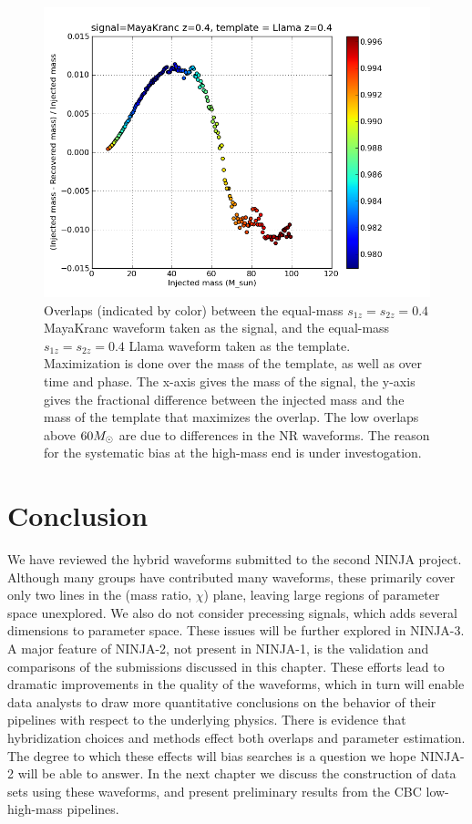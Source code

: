 \begin{figure}
  \includegraphics[width=\linewidth]{figures/ninja2/maya_llama_z0d4_max_over_m}
  \caption[Overlaps between spinning submissions maximized over mass]{
  \label{f:max_over_m_z4}
Overlaps (indicated by color) between the equal-mass $s_{1z} = s_{2z}
= 0.4$ MayaKranc waveform taken as the signal, and the equal-mass
$s_{1z} = s_{2z} = 0.4$ Llama waveform taken
as the template.  Maximization is done over the mass of the template,
as well as over time and phase.  The x-axis gives the mass of the
signal, the y-axis gives the fractional difference between the
injected mass and the mass of the template that maximizes the overlap.
The low overlaps above $60 M_\odot$ are due to differences in the NR
waveforms.  The reason for the systematic bias at the high-mass end is
under investogation.}
\end{figure}%


\section{Conclusion}

We have reviewed the hybrid waveforms submitted to the second NINJA
project.  Although many groups have contributed many waveforms, these
primarily cover only two lines  in the (mass ratio, $\chi$) plane,
leaving large regions of parameter space unexplored.  We also do not
consider precessing signals, which adds several dimensions to
parameter space.  These issues will be further explored in NINJA-3.  A
major feature of NINJA-2, not present in NINJA-1, is the validation
and comparisons of the submissions discussed in this chapter.  These
efforts lead to dramatic improvements in the quality of the waveforms,
which in turn will enable data analysts to draw more quantitative
conclusions on the behavior of their pipelines with respect to the
underlying physics.  There is evidence that hybridization choices and
methods effect both overlaps and parameter estimation.   The degree to
which these effects will bias searches is a question we hope NINJA-2
will be able to answer.  In the next chapter we discuss the
construction of data sets using these waveforms, and present
preliminary results from the CBC low- high-mass pipelines.


